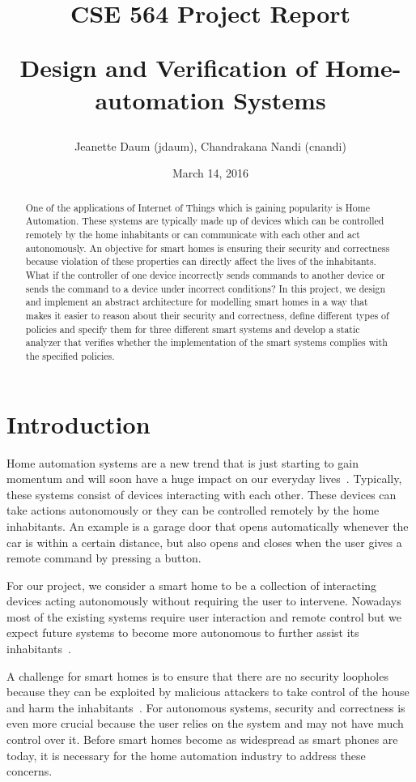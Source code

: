 \documentclass{article}
\title{\textbf{CSE 564 Project Report} 
\\
\begin{center}
\LARGE{Design and Verification of Home-automation Systems}
\end{center}\vspace{-2ex}}
\author{Jeanette Daum (jdaum), Chandrakana Nandi (cnandi) }
\date{March 14, 2016}
\begin{document}
\maketitle
\begin{abstract}
One of the applications of Internet of Things which is gaining popularity is Home Automation. These systems are typically made up of devices which can be controlled remotely by the home inhabitants or can communicate with each other and act autonomously. An objective for smart homes is ensuring their security and correctness because violation of these properties can directly affect the lives of the inhabitants. What if the controller of one device incorrectly sends commands to another device or sends the command to a device under incorrect conditions? In this project, we design and implement an abstract architecture for modelling smart homes in a way that makes it easier to reason about their security and correctness, define different types of policies and specify them for three different smart systems and develop a static analyzer that verifies whether the implementation of the smart systems complies with the specified policies. 

\end{abstract}
\section{Introduction}
Home automation systems are a new trend that is just starting to gain momentum and will soon have a huge impact on our everyday lives~\cite{samsung, homekit, echo, wink, homeos}. Typically, these systems consist of devices interacting with each other. These devices can take actions autonomously or they can be controlled remotely by the home inhabitants. An example is a garage door that opens automatically whenever the car is within a certain distance, but also opens and closes when the user gives a remote command by pressing a button. 

For our project, we consider a smart home to be a collection of interacting devices acting autonomously without requiring the user to intervene. Nowadays most of the existing systems require user interaction and remote control but we expect future systems to become more autonomous to further assist its inhabitants~\cite{homekit}.

A challenge for smart homes is to ensure that there are no security loopholes because they can be exploited by malicious attackers to take control of the house and harm the inhabitants~\cite{yoshi, jung}. For autonomous systems, security and correctness is even more crucial because the user relies on the system and may not have much control over it. Before smart homes become as widespread as smart phones are today, it is necessary for the home automation industry to address these concerns.
\end{document}
